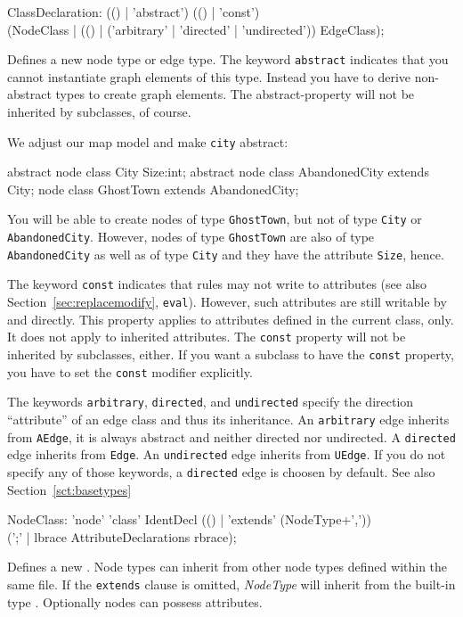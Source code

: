 \begin{rail}  
  ClassDeclaration: (() | 'abstract') (() | 'const') \\
    (NodeClass | (() | ('arbitrary' | 'directed' | 'undirected')) EdgeClass);
\end{rail}
Defines a new node type or edge type.
The keyword \texttt{abstract} indicates that you cannot instantiate graph elements of this type.
Instead you have to derive non-abstract types to create graph elements.
The abstract-property will not be inherited by subclasses, of course.

\begin{example}
We adjust our map model and make \texttt{city} abstract:
\begin{grgen}
abstract node class City {
	Size:int;
}
abstract node class AbandonedCity extends City;
node class GhostTown extends AbandonedCity;
\end{grgen}
You will be able to create nodes of type \texttt{GhostTown}, but not of type \texttt{City} or \texttt{AbandonedCity}. However, nodes of type \texttt{GhostTown} are also of type \texttt{AbandonedCity} as well as of type \texttt{City} and they have the attribute \texttt{Size}, hence.
\end{example}
The keyword \texttt{const} indicates that rules may not write to attributes (see also Section~\ref{sec:replacemodify}, \texttt{eval}). However, such attributes are still writable by \LibGr{} and \GrShell{} directly. This property applies to attributes defined in the current class, only. It does not apply to inherited attributes. The \texttt{const} property will not be inherited by subclasses, either. If you want a subclass to have the \texttt{const} property, you have to set the \texttt{const} modifier explicitly.

The keywords \texttt{arbitrary}, \texttt{directed}, and \texttt{undirected} specify the direction ``attribute'' of an edge class and thus its inheritance.
An \texttt{arbitrary} edge inherits from \texttt{AEdge}, it is always abstract and neither directed nor undirected.
A \texttt{directed} edge inherits from \texttt{Edge}.
An \texttt{undirected} edge inherits from \texttt{UEdge}.
If you do not specify any of those keywords, a \texttt{directed} edge is choosen by default.
See also Section~\ref{sct:basetypes}

\begin{rail}  
  NodeClass: 'node' 'class' IdentDecl (() | 'extends' (NodeType+',')) \\ 
    (';' | lbrace AttributeDeclarations rbrace);
\end{rail}
Defines a new . Node types can inherit from other node types defined within the same file. If the \texttt{extends} clause is omitted, \emph{NodeType} will inherit from the built-in type \texttt{}. Optionally nodes can possess attributes.

